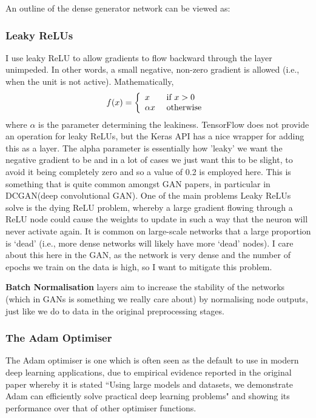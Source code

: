 \documentclass[12pt,a4paper,twoside]{report}
\begin{document}
An outline of the dense generator network can be viewed as:



\subsubsection{Leaky ReLUs}
I use leaky ReLU to allow gradients to flow backward through the layer unimpeded. In other words, a small negative, non-zero gradient is allowed (i.e., when the unit is not active). Mathematically, $$f ( x ) = \left\{ \begin{array} { l l } { x } & { \text{ if } x > 0} \\ { \alpha x } & { \text{ otherwise } } \end{array} \right.$$ where $\alpha$ is the parameter determining the leakiness. TensorFlow does not provide an operation for leaky ReLUs, but the Keras API has a nice wrapper for adding this as a layer. The alpha parameter is essentially how 'leaky' we want the negative gradient to be and in a lot of cases we just want this to be slight, to avoid it being completely zero and so a value of 0.2 is employed here. This is something that is quite common amongst GAN papers, in particular in DCGAN(deep convolutional GAN)\cite{DBLP:journals/corr/RadfordMC15}. One of the main problems Leaky ReLUs solve is the dying ReLU problem, whereby a large gradient flowing through a ReLU node could cause the weights to update in such a way that the neuron will never activate again. It is common on large-scale networks that a large proportion is `dead' (i.e., more dense networks will likely have more `dead' nodes). I care about this here in the GAN, as the network is very dense and the number of epochs we train on the data is high, so I want to mitigate this problem. 

\textbf{Batch Normalisation} layers aim to increase the stability of the networks (which in GANs is something we really care about) by normalising node outputs, just like we do to data in the original preprocessing stages.

\subsubsection{The Adam Optimiser}
The Adam optimiser is one which is often seen as the default to use in modern deep learning applications, due to empirical evidence reported in the original paper\cite{DBLP:journals/corr/KingmaB14} whereby it is stated ``Using large models and datasets, we demonstrate Adam can efficiently solve practical deep learning problems" and showing its performance over that of other optimiser functions. 
\end{document}
